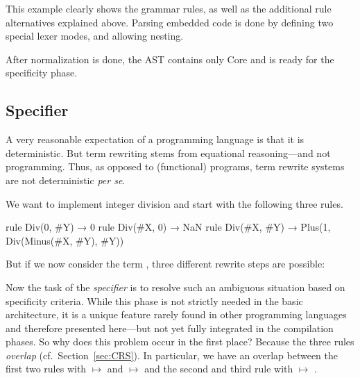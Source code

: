 This example clearly shows the  grammar rules, as well
as the additional rule alternatives explained above. Parsing embedded
\Tosca code is done by defining two special lexer modes,
 and  allowing nesting.

After normalization is done, the AST contains only \Tosca Core
and is ready for the specificity phase.

\subsection{Specifier} \label{specification} \label{sec:specification}

A very reasonable expectation of a programming language is that it is
deterministic. But term rewriting stems from equational
reasoning---and not programming. Thus, as opposed to (functional)
programs, term rewrite systems are not deterministic \emph{per se}. 
%
\begin{example} \label{ex:div}
 We want to implement integer division and start with the
 following three rules. 
\begin{lstTosca}
rule Div(0, #Y) → 0
rule Div(#X, 0)  → NaN
rule Div(#X, #Y) → Plus(1, Div(Minus(#X, #Y), #Y))
 \end{lstTosca}
 But if we now consider the term , three
 different rewrite steps are possible:
 \begin{center}	
  \end{center}  
\end{example}
%
Now the task of the \emph{specifier} is to resolve such an ambiguous
situation based on specificity criteria. While this phase is not
strictly needed in the basic \Tosca architecture, it is a unique
feature rarely found in other programming languages and therefore
presented here---but not yet fully integrated in the compilation
phases.
%
So why does this problem occur in the first place? Because the three
rules \emph{overlap} (cf.~Section~\ref{sec:CRS}).
%
In particular, we have an overlap between the
first two rules with %
%
 $\mapsto$  and
 $\mapsto$  %
%
and the second and third rule with %
  $\mapsto$ .
%

